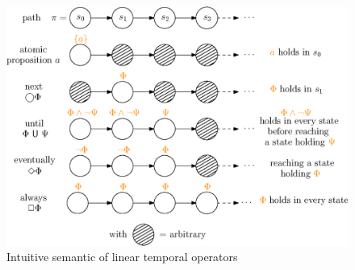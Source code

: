 \begin{figure}[h]
  \centering
  \includegraphics[width=0.85\linewidth]{resources/LTL}
  \caption{Intuitive semantic of linear temporal operators}\label{ltl}
\end{figure}

